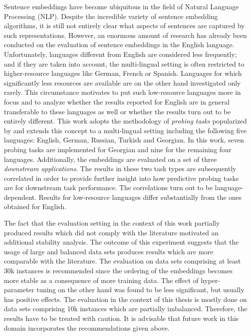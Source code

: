 Sentence embeddings have become ubiquitous in the field of Natural Language Processing (NLP). Despite the incredible variety of sentence embedding algorithms, it is still not entirely clear what aspects of sentences are captured by such representations. However, an enormous amount of research has already been conducted on the evaluation of sentence embeddings in the English language. Unfortunately, languages different from English are considered less frequently; and if they are taken into account, the multi-lingual setting is often restricted to higher-resource languages like German, French or Spanish. Languages for which significantly less resources are available are on the other hand investigated only rarely. This circumstance motivates to put such low-resource languages more in focus and to analyze whether the results reported for English are in general transferable to these languages as well or whether the results turn out to be entirely different. This work adopts the methodology of \textit{probing tasks} popularized by \citep{Conneau.2018a} and extends this concept to a multi-lingual setting including the following five languages: English, German, Russian, Turkish and Georgian. In this work, seven probing tasks are implemented for Georgian and nine for the remaining four languages. Additionally, the embeddings are evaluated on a set of three \textit{downstream applications}. The results in these two task types are subsequently correlated in order to provide further insight into how predictive probing tasks are for downstream task performance. The correlations turn out to be language-dependent. Results for low-resource languages differ substantially from the ones obtained for English.

The fact that the evaluation setting in the context of this work partially produced results which did not comply with the literature motivated an additional stability analysis. The outcome of this experiment suggests that the usage of large and balanced data sets produces results which are more comparable with the literature. The evaluation on data sets comprising at least 30k instances is recommended since the ordering of the embeddings becomes more stable as a consequence of more training data. The effect of hyper-parameter tuning on the other hand was found to be less significant, but usually has positive effects. The evaluation in the context of this thesis is mostly done on data sets comprising 10k instances which are partially imbalanced. Therefore, the results have to be treated with caution. It is advisable that future work in this domain incorporates the recommendations given above.